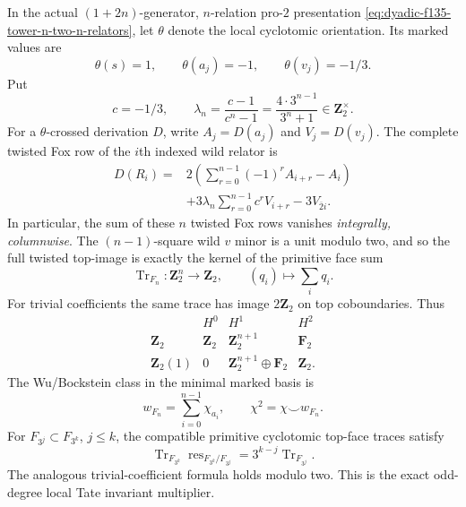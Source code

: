 \begin{theorem}
\label{thm:dyadic-f135-uniform-fox-tate-trace}
In the actual $(1+2n)$-generator,
$n$-relation pro-$2$ presentation
\eqref{eq:dyadic-f135-tower-n-two-n-relators},
let $\theta$ denote the local
cyclotomic orientation.  Its marked
values are
\[
\theta(s)=1,\qquad
\theta(a_j)=-1,\qquad
\theta(v_j)=-1/3.
\]
Put
\[
c=-1/3,\qquad
\lambda_n=\frac{c-1}{c^n-1}
=\frac{4\cdot3^{n-1}}{3^n+1}
\in\mathbf Z_2^\times.
\]
For a $\theta$-crossed derivation
$D$, write $A_j=D(a_j)$ and
$V_j=D(v_j)$.
The complete twisted Fox row of
the $i$th indexed wild relator is
\begin{equation}\label{eq:dyadic-f135-uniform-twisted-fox}
\boxed{
\begin{aligned}
D(R_i)={}&
2\left(\sum_{r=0}^{n-1}
(-1)^rA_{i+r}-A_i\right)\\
&+3\lambda_n
\sum_{r=0}^{n-1}c^rV_{i+r}
-3V_{\overline2 i}.
\end{aligned}}
\end{equation}
In particular, the sum of these
$n$ twisted Fox rows vanishes
\emph{integrally, columnwise}.
The $(n-1)$-square wild $v$
minor is a unit modulo two, and
so the full twisted top-image is
exactly the kernel of the
primitive face sum
\begin{equation}\label{eq:dyadic-f135-uniform-face-trace}
\boxed{
\operatorname{Tr}_{F_n}:
\mathbf Z_2^n\longrightarrow
\mathbf Z_2,\qquad
(q_i)\longmapsto\sum_iq_i.
}
\end{equation}
For trivial coefficients the
same trace has image
$2\mathbf Z_2$ on top coboundaries.
Thus
\begin{equation}\label{eq:dyadic-f135-uniform-tate-ledgers}
\boxed{
\begin{array}{c|ccc}
 &H^0&H^1&H^2\\\hline
\mathbf Z_2&
\mathbf Z_2&
\mathbf Z_2^{n+1}&\mathbf F_2\\
\mathbf Z_2(1)&
0&\mathbf Z_2^{n+1}
\oplus\mathbf F_2&\mathbf Z_2 .
\end{array}}
\end{equation}
The Wu/Bockstein class in the
minimal marked basis is
\[
w_{F_n}=\sum_{i=0}^{n-1}
\chi_{a_i},\qquad
\chi^2=\chi\smile w_{F_n}.
\]
For $F_{3^j}\subset F_{3^k}$,
$j\le k$, the compatible
primitive cyclotomic top-face
traces satisfy
\begin{equation}\label{eq:dyadic-f135-top-tate-transitivity}
\boxed{
\operatorname{Tr}_{F_{3^k}}
\operatorname{res}_{F_{3^k}/F_{3^j}}
=3^{k-j}\operatorname{Tr}_{F_{3^j}}.
}
\end{equation}
The analogous trivial-coefficient
formula holds modulo two.
This is the exact odd-degree
local Tate invariant multiplier.
\end{theorem}

